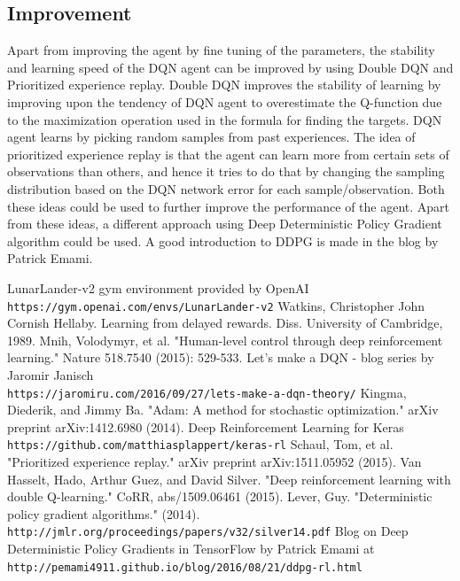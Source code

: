 \documentclass{article}
\begin{document}
\subsection*{Improvement}
Apart from improving the agent by fine tuning of the parameters, the stability and learning speed of the DQN agent can be improved by using Double DQN\cite{doubleq} and Prioritized experience replay\cite{prio}. Double DQN improves the stability of learning by improving upon the tendency of DQN agent to overestimate the Q-function due to the maximization operation used in the formula for finding the targets. DQN agent learns by picking random samples from past experiences. The idea of prioritized experience replay is that the agent can learn more from certain sets of observations than others, and hence it tries to do that by changing the sampling distribution based on the DQN network error for each sample/observation. Both these ideas could be used to further improve the performance of the agent. Apart from these ideas, a different approach using Deep Deterministic Policy Gradient\cite{DDPG} algorithm could be used. A good introduction to DDPG is made in the blog\cite{DDPGblog} by Patrick Emami.
\begin{thebibliography}{}
LunarLander-v2 gym environment provided by OpenAI\\ \texttt{https://gym.openai.com/envs/LunarLander-v2}
Watkins, Christopher John Cornish Hellaby. Learning from delayed rewards. Diss. University of Cambridge, 1989.
Mnih, Volodymyr, et al. "Human-level control through deep reinforcement learning." Nature 518.7540 (2015): 529-533.
Let’s make a DQN - blog series by Jaromir Janisch\\\texttt{https://jaromiru.com/2016/09/27/lets-make-a-dqn-theory/}
Kingma, Diederik, and Jimmy Ba. "Adam: A method for stochastic optimization." arXiv preprint arXiv:1412.6980 (2014).
Deep Reinforcement Learning for Keras\\\texttt{https://github.com/matthiasplappert/keras-rl}
Schaul, Tom, et al. "Prioritized experience replay." arXiv preprint arXiv:1511.05952 (2015).
Van Hasselt, Hado, Arthur Guez, and David Silver. "Deep reinforcement learning with double Q-learning." CoRR, abs/1509.06461 (2015).
Lever, Guy. "Deterministic policy gradient algorithms." (2014).\\\texttt{http://jmlr.org/proceedings/papers/v32/silver14.pdf}
Blog on Deep Deterministic Policy Gradients in TensorFlow by Patrick Emami at\\\texttt{http://pemami4911.github.io/blog/2016/08/21/ddpg-rl.html}
\end{thebibliography}
\end{document}
